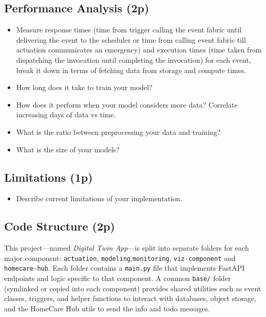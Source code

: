 \documentclass[A4,10pt]{article}
\begin{document}
\subsection{ Performance Analysis (2p)}

\begin{itemize}
	\item Measure response times (time from trigger calling the event fabric until delivering the event to the scheduler or time from calling event fabric till actuation communicates an emergency) and execution times (time taken from dispatching the invocation until completing the invocation) for each event, break it down in terms of fetching data from storage and compute times.
	\item How long does it take to train your model?
	\item How does it perform when your model considers more data? Correlate increasing days of data vs time.
	\item What is the ratio between preprocessing your data and training? 
	\item What is the size of your models?
\end{itemize}


\subsection{ Limitations (1p)}

\begin{itemize}
	\item Describe current limitations of your implementation.
\end{itemize}


\subsection{Code Structure (2p)}
\label{sec:code_structure}

This project---named \textit{Digital Twin App}---is split into separate folders for each major component: 
\texttt{actuation}, \texttt{modeling},\texttt{monitoring}, \texttt{viz-component} and \texttt{homecare-hub}. Each folder contains a \texttt{main.py} file
that implements FastAPI endpoints and logic specific to that component.
A common \texttt{base/} folder (symlinked or copied into each component) provides shared utilities 
such as event classes, triggers, and helper functions to interact with databases, object storage, 
and the HomeCare Hub utils to send the info and todo messages.
\end{document}
